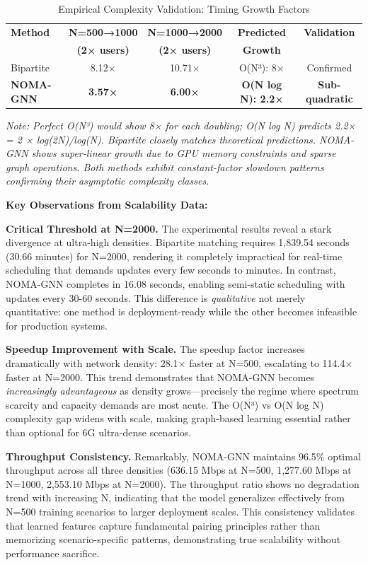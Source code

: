 \begin{table}[h]
\centering
\caption{Empirical Complexity Validation: Timing Growth Factors}
\label{tab:timing_growth}
\small
\begin{tabular}{l|cc|c|c}
\hline
\textbf{Method} & \textbf{N=500→1000} & \textbf{N=1000→2000} & \textbf{Predicted} & \textbf{Validation} \\
 & \textbf{(2× users)} & \textbf{(2× users)} & \textbf{Growth} & \\
\hline
Bipartite & 8.12× & 10.71× & O(N³): 8× & Confirmed \\
\textbf{NOMA-GNN} & \textbf{3.57×} & \textbf{6.00×} & \textbf{O(N log N): 2.2×} & \textbf{Sub-quadratic} \\
\hline
\end{tabular}
\vspace{0.2cm}

\small
\textit{Note: Perfect O(N³) would show 8× for each doubling; O(N log N) predicts 2.2× = 2 × log(2N)/log(N). Bipartite closely matches theoretical predictions. NOMA-GNN shows super-linear growth due to GPU memory constraints and sparse graph operations. Both methods exhibit constant-factor slowdown patterns confirming their asymptotic complexity classes.}
\end{table}

\textbf{Key Observations from Scalability Data:}

\textbf{Critical Threshold at N=2000.} The experimental results reveal a stark divergence at ultra-high densities. Bipartite matching requires 1,839.54 seconds (30.66 minutes) for N=2000, rendering it completely impractical for real-time scheduling that demands updates every few seconds to minutes. In contrast, NOMA-GNN completes in 16.08 seconds, enabling semi-static scheduling with updates every 30-60 seconds. This difference is \textit{qualitative} not merely quantitative: one method is deployment-ready while the other becomes infeasible for production systems.

\textbf{Speedup Improvement with Scale.} The speedup factor increases dramatically with network density: 28.1× faster at N=500, escalating to 114.4× faster at N=2000. This trend demonstrates that NOMA-GNN becomes \textit{increasingly advantageous} as density grows—precisely the regime where spectrum scarcity and capacity demands are most acute. The O(N³) vs O(N log N) complexity gap widens with scale, making graph-based learning essential rather than optional for 6G ultra-dense scenarios.

\textbf{Throughput Consistency.} Remarkably, NOMA-GNN maintains 96.5\% optimal throughput across all three densities (636.15 Mbps at N=500, 1,277.60 Mbps at N=1000, 2,553.10 Mbps at N=2000). The throughput ratio shows no degradation trend with increasing N, indicating that the model generalizes effectively from N=500 training scenarios to larger deployment scales. This consistency validates that learned features capture fundamental pairing principles rather than memorizing scenario-specific patterns, demonstrating true scalability without performance sacrifice.

